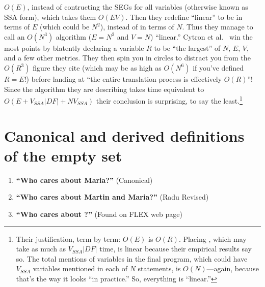 \documentclass[12pt,titlepage,twoside]{article}
\let\oldsection\section
\renewcommand{\section}{\setcounter{figure}{0}\setcounter{table}{0}\oldsection}
\begin{document}
\begin{enumerate}
$O(E)$, instead of contructing the SEGs for all variables (otherwise
known as SSA form), which takes them $O(EV)$.  Then they redefine
``linear'' to be in terms of $E$ (which could be $N^2$), instead of in
terms of $N$.  Thus they manage to call an $O(N^3)$ algorithm ($E=N^2$
and $V=N$) ``linear.''  Cytron et al.\ \cite{cytron91:ssa} win the
most points by blatently declaring a variable $R$ to be ``the
largest'' of $N$, $E$, $V$, and a few other metrics.  They then spin
you in circles to distract you from the $O(R^3)$ figure they cite
(which may be as high as $O(N^6)$ if you've defined $R=E$!) before
landing at ``the entire translation process is effectively $O(R)$''!
Since the algorithm they are describing takes time equivalent to
$O(E+V_{SSA}|{DF}|+NV_{SSA})$ their conclusion is surprising, to say
the least.\footnote{Their justification, term by term: $O(E)$ is
$O(R)$.  Placing , which may take as much as
$V_{SSA}|{DF}|$ time, is linear because their empirical results say
so.  The total mentions of variables in the final program, which could
have $V_{SSA}$ variables mentioned in each of $N$ statements, is
$O(N)$---again, because that's the way it looks ``in practice.''  So,
everything is ``linear.''}
\end{enumerate}

\section{Canonical and derived definitions of the empty set}
\begin{enumerate}
\item \textbf{``Who cares about Maria?''} (Canonical) \cite{marinov99}
\item \textbf{``Who cares about Martin and Maria?''} (Radu Revised)
\item \textbf{``Who cares about ?''} (Found on FLEX web page)
\end{enumerate}
\end{document}
